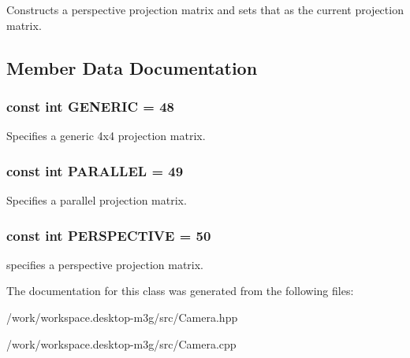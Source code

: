 Constructs a perspective projection matrix and sets that as the current projection matrix. 

\subsection{Member Data Documentation}
\hypertarget{classm3g_1_1Camera_48a4e153c97a1f4890558a77dfe02ca4}{
\subsubsection[{GENERIC}]{\setlength{\rightskip}{0pt plus 5cm}const int {\bf GENERIC} = 48}}
\label{classm3g_1_1Camera_48a4e153c97a1f4890558a77dfe02ca4}


Specifies a generic 4x4 projection matrix. \hypertarget{classm3g_1_1Camera_d9630da0e9505afbb107c86229aa2f08}{
\subsubsection[{PARALLEL}]{\setlength{\rightskip}{0pt plus 5cm}const int {\bf PARALLEL} = 49}}
\label{classm3g_1_1Camera_d9630da0e9505afbb107c86229aa2f08}


Specifies a parallel projection matrix. \hypertarget{classm3g_1_1Camera_e62e72bde93e7d7ceb482e7a8c40dcf5}{
\subsubsection[{PERSPECTIVE}]{\setlength{\rightskip}{0pt plus 5cm}const int {\bf PERSPECTIVE} = 50}}
\label{classm3g_1_1Camera_e62e72bde93e7d7ceb482e7a8c40dcf5}


specifies a perspective projection matrix. 

The documentation for this class was generated from the following files:\begin{CompactItemize}
\item 
/work/workspace.desktop-m3g/src/Camera.hpp\item 
/work/workspace.desktop-m3g/src/Camera.cpp\end{CompactItemize}
